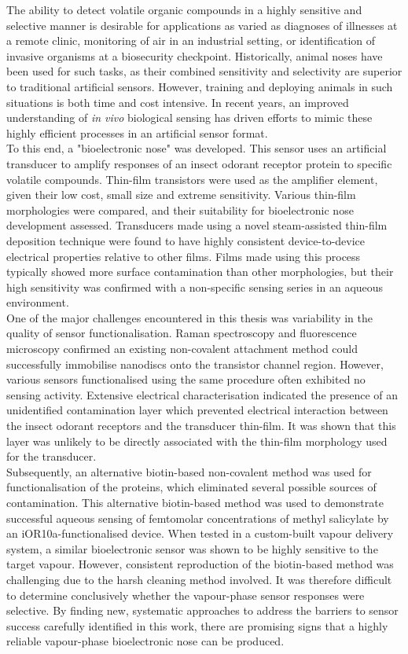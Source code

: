 \documentclass[
  a4paper,
]{scrbook}
\begin{document}
The ability to detect volatile organic compounds in a highly sensitive and selective manner is desirable for applications as varied as diagnoses of illnesses at a remote clinic, monitoring of air in an industrial setting, or identification of invasive organisms at a biosecurity checkpoint. Historically, animal noses have been used for such tasks, as their combined sensitivity and selectivity are superior to traditional artificial sensors. However, training and deploying animals in such situations is both time and cost intensive. In recent years, an improved understanding of \textit{in vivo} biological sensing has driven efforts to mimic these highly efficient processes in an artificial sensor format. \\[5pt] To this end, a "bioelectronic nose" was developed. This sensor uses an artificial transducer to amplify responses of an insect odorant receptor protein to specific volatile compounds. Thin-film transistors were used as the amplifier element, given their low cost, small size and extreme sensitivity. Various thin-film morphologies were compared, and their suitability for bioelectronic nose development assessed. Transducers made using a novel steam-assisted thin-film deposition technique were found to have highly consistent device-to-device electrical properties relative to other films. Films made using this process typically showed more surface contamination than other morphologies, but their high sensitivity was confirmed with a non-specific sensing series in an aqueous environment. \\[5pt] One of the major challenges encountered in this thesis was variability in the quality of sensor functionalisation. Raman spectroscopy and fluorescence microscopy confirmed an existing non-covalent attachment method could successfully immobilise nanodiscs onto the transistor channel region. However, various sensors functionalised using the same procedure often exhibited no sensing activity. Extensive electrical characterisation indicated the presence of an unidentified contamination layer which prevented electrical interaction between the insect odorant receptors and the transducer thin-film. It was shown that this layer was unlikely to be directly associated with the thin-film morphology used for the transducer. \\[5pt] Subsequently, an alternative biotin-based non-covalent method was used for functionalisation of the proteins, which eliminated several possible sources of contamination. This alternative biotin-based method was used to demonstrate successful aqueous sensing of femtomolar concentrations of methyl salicylate by an iOR10a-functionalised device. When tested in a custom-built vapour delivery system, a similar bioelectronic sensor was shown to be highly sensitive to the target vapour. However, consistent reproduction of the biotin-based method was challenging due to the harsh cleaning method involved. It was therefore difficult to determine conclusively whether the vapour-phase sensor responses were selective. By finding new, systematic approaches to address the barriers to sensor success carefully identified in this work, there are promising signs that a highly reliable vapour-phase bioelectronic nose can be produced.
\end{document}

